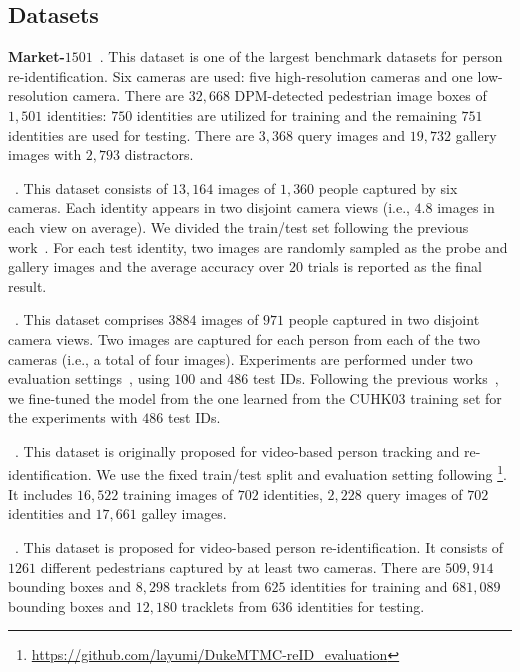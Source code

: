 \documentclass{llncs}
\begin{document}
\subsection{Datasets}

\noindent
{\bf Market-$1501$}~\cite{conf/iccv/zheng15}. This dataset is one of the largest benchmark datasets for person re-identification.
Six cameras are used: five high-resolution cameras and one low-resolution camera.
There are $32,668$ DPM-detected pedestrian image boxes of $1,501$ identities:
$750$ identities are utilized for training and
the remaining $751$ identities are used for testing.
There are $3,368$ query images and $19,732$ gallery images
with $2,793$ distractors.

\vspace{0.1cm}
~\cite{deepreid2014}. This dataset consists of
$13,164$ images of $1,360$ people
captured by six cameras.
Each identity appears in two disjoint camera views (i.e., $4.8$ images in each view on average).
We divided the train/test set following the previous work~\cite{deepreid2014}.
For each test identity, two images are randomly sampled as the probe and gallery images and the average accuracy over $20$ trials is reported as the final result.

\vspace{0.1cm}
~\cite{conf/accv/li12}. This dataset comprises $3884$ images of
$971$ people captured in two disjoint camera views.
Two images are captured for each person from each of the two cameras (i.e., a total of four images).
Experiments are performed under two evaluation settings~\cite{improved2015}, using $100$ and $486$ test IDs.
Following the previous works~\cite{improved2015,chen2016deep,ChengGZWZ16,ZhaoLZW17},
we fine-tuned the model from the one learned from the CUHK$03$ training set for the experiments with $486$ test IDs.



\vspace{0.1cm}
~\cite{DukeMTMC}. This dataset is originally proposed for video-based person tracking and re-identification.
We use the fixed train/test split and evaluation setting following \cite{journal/arxiv/lin17}\footnote{\url{https://github.com/layumi/DukeMTMC-reID_evaluation}}.
It includes $16,522$ training images of $702$ identities,
$2,228$ query images of $702$ identities and $17,661$ galley images.

\vspace{0.1cm}
~\cite{ZhengBSWSWT16}. This dataset is proposed for video-based person re-identification.
It consists of $1261$ different pedestrians captured by at least two cameras.
There are $509,914$ bounding boxes and $8,298$ tracklets from $625$ identities for training
and $681,089$ bounding boxes and $12,180$ tracklets from $636$ identities for testing.
\end{document}
